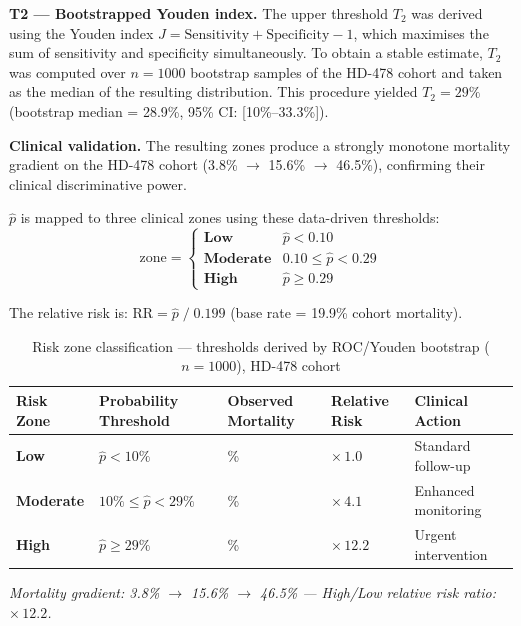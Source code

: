 \documentclass[12pt,a4paper,twoside]{report}
\begin{document}
\medskip
\noindent\textbf{T2 — Bootstrapped Youden index.} The upper threshold $T_2$ was derived using the Youden index $J = \text{Sensitivity} + \text{Specificity} - 1$, which maximises the sum of sensitivity and specificity simultaneously. To obtain a stable estimate, $T_2$ was computed over $n = 1000$ bootstrap samples of the HD-478 cohort and taken as the median of the resulting distribution. This procedure yielded $T_2 = 29\%$ (bootstrap median = 28.9\%, 95\% CI: [10\%–33.3\%]).

\medskip
\noindent\textbf{Clinical validation.} The resulting zones produce a strongly monotone mortality gradient on the HD-478 cohort (3.8\% $\to$ 15.6\% $\to$ 46.5\%), confirming their clinical discriminative power.

$\hat{p}$ is mapped to three clinical zones using these data-driven thresholds:
\begin{equation}
\text{zone} =
\begin{cases}
\textbf{Low}      & \hat{p} < 0.10 \\[2pt]
\textbf{Moderate} & 0.10 \leq \hat{p} < 0.29 \\[2pt]
\textbf{High}     & \hat{p} \geq 0.29
\end{cases}
\label{eq:risk_zones}
\end{equation}

The relative risk is: $\text{RR} = \hat{p} \;/\; 0.199$ (base rate = 19.9\% cohort mortality).

\begin{table}[htbp]
\centering
\caption{Risk zone classification --- thresholds derived by ROC/Youden bootstrap ($n=1000$), HD-478 cohort}
\label{tab:risk_zones}
\renewcommand{\arraystretch}{1.45}
\begin{tabularx}{\textwidth}{>{\bfseries}p{2.2cm}
                              >{\centering\arraybackslash}p{3.2cm}
                              >{\centering\arraybackslash}p{2.8cm}
                              >{\centering\arraybackslash}p{2.0cm}
                              >{\centering\arraybackslash}X}
\toprule
\rowcolor{darkblue!10}
\textbf{Risk Zone} & \textbf{Probability Threshold} & \textbf{Observed Mortality} & \textbf{Relative Risk} & \textbf{Clinical Action} \\
\midrule
\cellcolor{teal!18}\textcolor{teal!50!black}{Low}
  & $\hat{p} < 10\%$
  & 3.8\%
  & $\times\,1.0$
  & Standard follow-up \\[2pt]
\cellcolor{orange!18}\textcolor{orange!60!black}{Moderate}
  & $10\% \leq \hat{p} < 29\%$
  & 15.6\%
  & $\times\,4.1$
  & Enhanced monitoring \\[2pt]
\cellcolor{red!18}\textcolor{red!60!black}{High}
  & $\hat{p} \geq 29\%$
  & 46.5\%
  & $\times\,12.2$
  & Urgent intervention \\
\bottomrule
\end{tabularx}
\smallskip
\noindent\footnotesize\textit{Mortality gradient: 3.8\% $\to$ 15.6\% $\to$ 46.5\% --- High/Low relative risk ratio: $\mathbf{\times\,12.2}$.}
\end{table}
\end{document}
